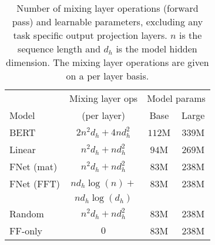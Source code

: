 \documentclass[11pt]{article}
\begin{document}
\begin{table}
    \caption{Number of mixing layer operations (forward pass) and learnable parameters, excluding any task specific output projection layers. $n$ is the sequence length and $d_{h}$ is the model hidden dimension. The mixing layer operations are given on a per layer basis.}
    \label{tab:model_params}
    \centering
    \setlength{\tabcolsep}{3pt}
    \begin{tabular}{l | c | c  c}
        \hline
         & Mixing layer ops & \multicolumn{2}{c}{Model params} \\ 
         Model & (per layer) & Base & Large \\  \hline \hline
         BERT & $2 n^2 d_{h} + 4 n d_{h}^2$ & $112$M & $339$M \\
         Linear & $n^2 d_{h} + n d_{h}^2$ & $94$M & $269$M \\
         FNet (mat) & $n^2 d_{h} + n d_{h}^2$ & $83$M & $238$M \\
         FNet (FFT) & $n d_{h} \log(n) +$ & $83$M & $238$M \\
         & $n d_{h}\log(d_{h})$ & \\
         Random & $n^2 d_{h} + nd_{h}^2$ & $83$M & $238$M \\
         FF-only & $0$ & $83$M & $238$M \\ \hline
    \end{tabular} 
\end{table}
\end{document}
